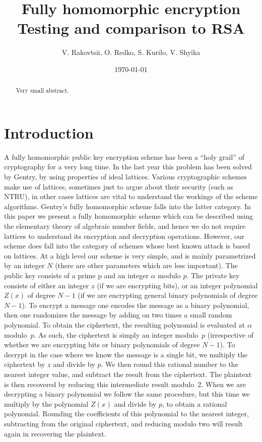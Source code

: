 \documentclass[a4paper, 12pt]{article}
\title{Fully homomorphic encryption \\ \vspace{2mm} {\large Testing and comparison to RSA}}
\author{V. Rakovtsii, O. Redko, S. Kurilo, V. Shyika}
\date{\today}
\begin{document}
	
	\clearpage
	\maketitle
	\thispagestyle{empty}
	
	
	\clearpage
	\thispagestyle{empty}
	\begin{abstract}
	Very small abstract.
	\end{abstract}
	
	
	\tableofcontents
	
	
	\section{Introduction}

	A fully homomorphic public key encryption scheme has been a “holy grail” of cryptography for a very long time.
	In the last year this problem has been solved by Gentry, by using properties of ideal lattices. Various cryptographic schemes make use of lattices, sometimes just to argue about their security (such as NTRU), in other cases lattices are vital to understand the workings of the scheme algorithms. Gentry’s fully homomorphic scheme falls into the latter category.
	In this paper we present a fully homomorphic scheme which can be described using the elementary theory of algebraic number fields, and hence we do not require lattices to understand its encryption and decryption operations. However, our scheme does fall into the category of schemes whose best known attack is based on lattices.
	At a high level our scheme is very simple, and is mainly parametrized by an integer $N$ (there are other parameters which are less important). The public key consists of a prime p and an integer $\alpha$ modulo $p$.
	The private key consists of either an integer $z$ (if we are encrypting bits), or an integer polynomial $Z(x)$ of degree $N - 1$ (if we are encrypting general binary polynomials of degree $N - 1$).
	To encrypt a message one encodes the message as a binary polynomial, then one randomizes the message by adding on two times a small random polynomial.
	To obtain the ciphertext, the resulting polynomial is evaluated at $\alpha$ modulo~$p$.
	As such, the ciphertext is simply an integer modulo~$p$ (irrespective of whether we are encrypting bits or binary polynomials of degree $N - 1$).
	To decrypt in the case where we know the message is a single bit, we multiply the ciphertext by $z$ and divide by $p$. We then round this rational number to the nearest integer value, and subtract the result from the ciphertext. 
	The plaintext is then recovered by reducing this intermediate result modulo~2. 
	When we are decrypting a binary polynomial we follow the same procedure, but this time we multiply by the polynomial $Z(x)$ and divide by $p$, to obtain a rational polynomial. 
	Rounding the coefficients of this polynomial to the nearest integer, subtracting from the original ciphertext, and reducing modulo two will result again in recovering the plaintext.
	
\end{document}
